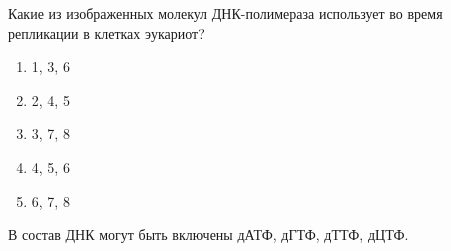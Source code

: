 
Какие из изображенных
молекул ДНК-полимераза использует во время репликации в клетках эукариот?


\begin{enumerate}
    \item 1, 3, 6
    \item 2, 4, 5
    \item 3, 7, 8
    \item 4, 5, 6
    \item 6, 7, 8
\end{enumerate}

\explanationSection

В состав ДНК могут быть включены дАТФ, дГТФ, дТТФ, дЦТФ.

